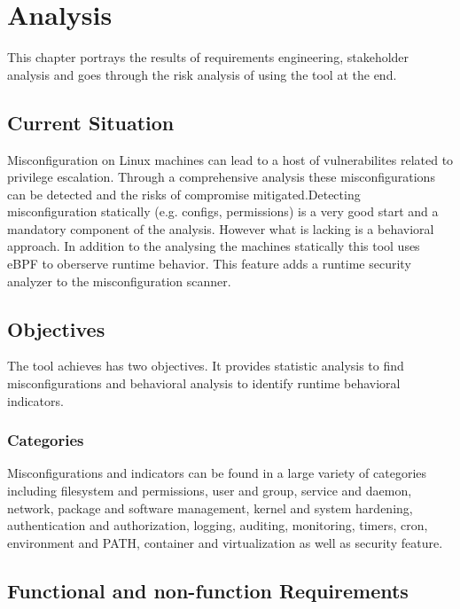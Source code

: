 \section{Analysis}

This chapter portrays the results of requirements engineering, stakeholder analysis and goes through the risk analysis of using the tool at the end.

\subsection{Current Situation}

Misconfiguration on Linux machines can lead to a host of vulnerabilites related to privilege escalation. Through a comprehensive analysis these misconfigurations can be detected and the risks of compromise mitigated.\newline\newline Detecting misconfiguration statically (e.g. configs, permissions) is a very good start and a mandatory component of the analysis. However what is lacking is a behavioral approach. In addition to the analysing the machines statically this tool uses eBPF to oberserve runtime behavior. This feature adds a runtime security analyzer to the misconfiguration scanner.

\subsection{Objectives}

The tool achieves has two objectives. It provides statistic analysis to find misconfigurations and behavioral analysis to identify runtime behavioral indicators.

\subsubsection{Categories}

Misconfigurations and indicators can be found in a large variety of categories including filesystem and permissions, user and group, service and daemon, network, package and software management, kernel and system hardening, authentication and authorization, logging, auditing, monitoring, timers, cron, environment and PATH, container and virtualization as well as security feature.

\subsection{Functional and non-function Requirements}

